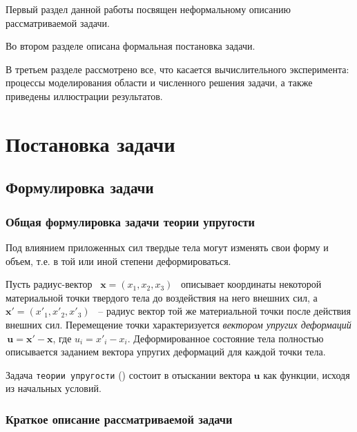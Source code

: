 \documentclass[a4paper, 14pt]{extreport}
\begin{document}
Первый раздел данной работы посвящен неформальному описанию рассматриваемой
задачи.

Во втором разделе описана формальная постановка задачи.

В третьем разделе рассмотрено все, что касается вычислительного эксперимента:
процессы моделирования области и численного решения задачи, а также 
приведены иллюстрации результатов.


\newpage
\chapter{Постановка задачи}
\section{Формулировка задачи}
\subsection{Общая формулировка задачи теории упругости}


Под влиянием приложенных сил твердые тела могут изменять свои форму и объем, 
т.е. в той или иной степени деформироваться.

Пусть радиус-вектор \, $\textbf{x} = (x_1, x_2, x_3)$ \, описывает координаты 
некоторой материальной точки твердого тела до воздействия на него внешних сил,
а \, $\textbf{x}' = (x'_1, x'_2, x'_3)$ \, -- радиус вектор той же материальной
точки после действия внешних сил. Перемещение точки характеризуется 
\textit{вектором упругих деформаций} \,$\textbf{u} = \textbf{x}' - \textbf{x}$, 
где  $u_i = x'_i - x_i$. Деформированное состояние тела
полностью описывается заданием вектора упругих деформаций для каждой точки тела.

Задача \texttt{теории упругости} (\cite{math_elasticity_theory}) состоит в 
отыскании вектора $\textbf{u}$ как функции, исходя из начальных условий.

\subsection{Краткое описание рассматриваемой задачи}
\end{document}
